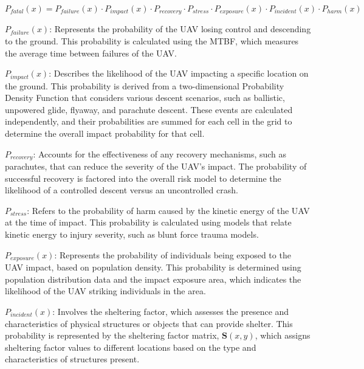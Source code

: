 \documentclass[12pt]{report}
\begin{document}
        \begin{equation}\label{eq:fullprobability}
            P_{fatal}(x) = P_{failure}(x) \cdot P_{impact}(x) \cdot P_{recovery} \cdot P_{stress} \cdot P_{exposure}(x) \cdot P_{incident}(x) \cdot P_{harm}(x)
        \end{equation}

        \begin{myitemize}
            \item \(P_{failure}(x)\): Represents the probability of the UAV losing control and descending to the ground.
            This probability is calculated using the MTBF, which measures the average time between failures of the UAV. 
                    
            \item \(P_{impact}(x)\): Describes the likelihood of the UAV impacting a specific location on the ground.
            This probability is derived from a two-dimensional Probability Density Function that considers various
            descent scenarios, such as ballistic, unpowered glide, flyaway, and parachute descent. These events are
            calculated independently, and their probabilities are summed for each cell in the grid to determine the
            overall impact probability for that cell.
                    
            \item \(P_{recovery}\): Accounts for the effectiveness of any recovery mechanisms, such as parachutes, that
            can reduce the severity of the UAV's impact. The probability of successful recovery is factored into the
            overall risk model to determine the likelihood of a controlled descent versus an uncontrolled crash.
                    
            \item \(P_{stress}\): Refers to the probability of harm caused by the kinetic energy of the UAV at the time
            of impact. This probability is calculated using models that relate kinetic energy to injury severity, such
            as blunt force trauma models. 
                    
            \item \(P_{exposure}(x)\): Represents the probability of individuals being exposed to the UAV impact, based
            on population density. This probability is determined using population distribution data and the impact
            exposure area, which indicates the likelihood of the UAV striking individuals in the area.
                    
            \item \(P_{incident}(x)\): Involves the sheltering factor, which assesses the presence and characteristics
            of physical structures or objects that can provide shelter. This probability is represented by the
            sheltering factor matrix, \(\mathbf{S}(x, y)\), which assigns sheltering factor values to different
            locations based on the type and characteristics of structures present.
        \end{myitemize}
\end{document}
